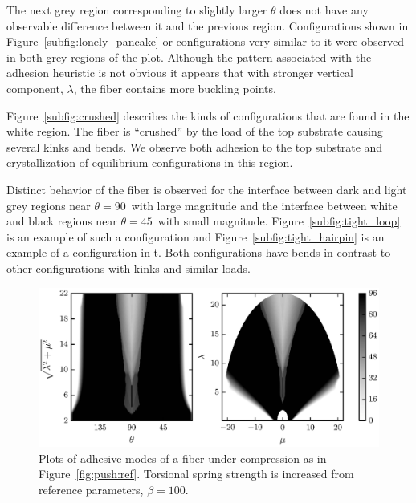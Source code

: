 The next grey region corresponding to slightly larger $\theta$ does not have any observable difference between it and the previous region. Configurations shown in Figure~\ref{subfig:lonely_pancake} or configurations very similar to it were observed in both grey regions of the plot. Although the pattern associated with the adhesion heuristic is not obvious it appears that with stronger vertical component, $\lambda$, the fiber contains more buckling points.

Figure~\ref{subfig:crushed} describes the kinds of configurations that are found in the white region. The fiber is ``crushed'' by the load of the top substrate causing several kinks and bends. We observe both adhesion to the top substrate and crystallization of equilibrium configurations in this region. 

Distinct behavior of the fiber is observed for the interface between dark and light grey regions near $\theta=90$\textdegree\ with large magnitude and the interface between white and black regions near $\theta=45$\textdegree\ with small magnitude. Figure~\ref{subfig:tight_loop} is an example of such a configuration and Figure~\ref{subfig:tight_hairpin} is an example of a configuration in t. Both configurations have bends in contrast to other configurations with kinks and similar loads.

	\begin{figure}[t]
		\begin{center}
			\includegraphics{./fig/ch3/push/b100/grid.eps}
		\end{center}		
		\caption{Plots of adhesive modes of a fiber under compression as in Figure~\ref{fig:push:ref}. Torsional spring strength is increased from reference parameters, $\beta=100$.
		\label{fig:push:b100}}
	\end{figure}	
	
